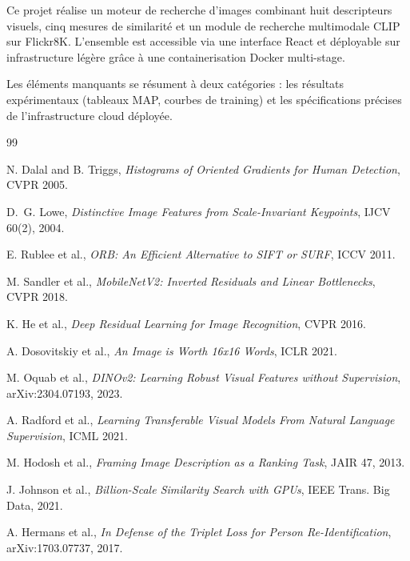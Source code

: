 \documentclass[12pt,a4paper]{report}
\begin{document}
Ce projet réalise un moteur de recherche d'images combinant huit descripteurs visuels, cinq mesures de similarité et un module de recherche multimodale CLIP sur Flickr8K. L'ensemble est accessible via une interface React et déployable sur infrastructure légère grâce à une containerisation Docker multi-stage.

Les éléments manquants se résument à deux catégories : les résultats expérimentaux (tableaux MAP, courbes de training) et les spécifications précises de l'infrastructure cloud déployée.

\begin{thebibliography}{99}

N. Dalal and B. Triggs, \textit{Histograms of Oriented Gradients for Human Detection}, CVPR 2005.

D.~G. Lowe, \textit{Distinctive Image Features from Scale-Invariant Keypoints}, IJCV 60(2), 2004.

E. Rublee et al., \textit{ORB: An Efficient Alternative to SIFT or SURF}, ICCV 2011.

M. Sandler et al., \textit{MobileNetV2: Inverted Residuals and Linear Bottlenecks}, CVPR 2018.

K. He et al., \textit{Deep Residual Learning for Image Recognition}, CVPR 2016.

A. Dosovitskiy et al., \textit{An Image is Worth 16x16 Words}, ICLR 2021.

M. Oquab et al., \textit{DINOv2: Learning Robust Visual Features without Supervision}, arXiv:2304.07193, 2023.

A. Radford et al., \textit{Learning Transferable Visual Models From Natural Language Supervision}, ICML 2021.

M. Hodosh et al., \textit{Framing Image Description as a Ranking Task}, JAIR 47, 2013.

J. Johnson et al., \textit{Billion-Scale Similarity Search with GPUs}, IEEE Trans. Big Data, 2021.

A. Hermans et al., \textit{In Defense of the Triplet Loss for Person Re-Identification}, arXiv:1703.07737, 2017.

\end{thebibliography}
\end{document}
